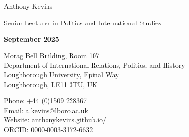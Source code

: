 \documentclass[letterpaper,fontsize=10.5pt]{scrartcl}
\begin{document}
\pagestyle{plain}



\huge Anthony Kevins\\
\begin{minipage}[t]{.75\linewidth}
	\large Senior Lecturer in Politics and International Studies\\ 
\end{minipage}%
\begin{minipage}[t]{.25\linewidth}
	\raggedleft
	\scriptsize \textbf{September 2025}\\
\end{minipage}%
\normalsize

\hrulefill

\begin{minipage}[p]{.6\linewidth}
	\raggedright
	\medskip
	Morag Bell Building, Room 107\\
	Department of International Relations, Politics, and History\\
	Loughborough University, Epinal Way\\
	Loughborough, LE11 3TU, UK\\
	\medskip
\end{minipage}%
\begin{minipage}[p]{.4\linewidth}
	\raggedleft
	\medskip
	Phone: \href{tel:+4401509228367}{+44 (0)1509 228367}\\
	Email: \href{mailto:a.kevins@lboro.ac.uk}{a.kevins@lboro.ac.uk}\\
	Website: \href{https://anthonykevins.github.io/}{anthonykevins.github.io/}\\
	ORCID: \href{https://orcid.org/0000-0003-3172-6632}{0000-0003-3172-6632}\\
	\medskip%
\end{minipage}

\hrulefill

\end{document}
